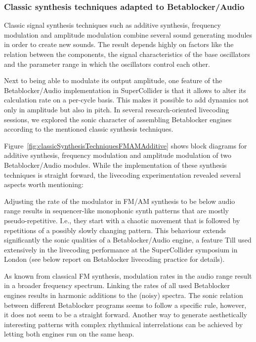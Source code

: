 \documentclass[letterpaper, 12pt]{article}
\begin{document}
\subsubsection{Classic synthesis techniques adapted to Betablocker/Audio} %
\label{sub:classic_synthesis_techniques_adapted_to_betablocker}

Classic signal synthesis techniques such as additive synthesis, frequency modulation and amplitude modulation combine several sound generating modules in order to create new sounds.
The result depends highly on factors like the relation between the components, the signal characteristics of the base oscillators and the parameter range in which the oscillators control each other.

Next to being able to modulate its output amplitude, one feature of the Betablocker/Audio implementation in SuperCollider is that it allows to alter its calculation rate on a per-cycle basis.
This makes it possible to add dynamics not only in amplitude but also in pitch.
In several research-oriented livecoding sessions, we explored the sonic character of assembling Betablocker engines according to the mentioned classic synthesis techniques.

Figure~\ref{fig:classicSynthesisTechniquesFMAMAdditive} shows block diagrams for additive synthesis, frequency modulation and amplitude modulation of two  Betablocker/Audio modules.
While the implementation of these synthesis techniques is straight forward, the livecoding experimentation revealed several aspects worth mentioning:

Adjusting the rate of the modulator in FM/AM synthesis to be below audio range results in sequencer-like monophonic synth patterns that are mostly pseudo-repetitive. 
I.e., they start with a chaotic movement that is followed by repetitions of a possibly slowly changing pattern.
This behaviour extends significantly the sonic qualities of a Betablocker/Audio engine, a feature Till used extensively in the livecoding performance at the SuperCollider symposium in London (see below report on Betablocker livecoding practice for details).

As known from classical FM synthesis, modulation rates in the audio range result in a broader frequency spectrum.
Linking the rates of all used Betablocker engines results in harmonic additions to the (noisy) spectra.
The sonic relation between different Betablocker programs seems to follow a specific rule, however, it does not seem to be a straight forward.
Another way to generate aesthetically interesting patterns with complex rhythmical interrelations can be achieved by letting both engines run on the same heap.
\end{document}
